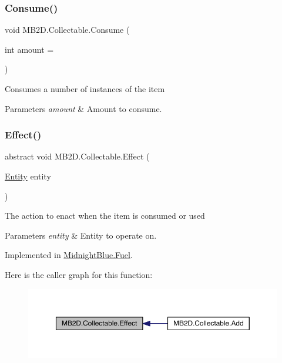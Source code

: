 \subsubsection{\texorpdfstring{Consume()}{Consume()}}
{\footnotesize\ttfamily void M\+B2\+D.\+Collectable.\+Consume (\begin{DoxyParamCaption}\item[{int}]{amount = {} }\end{DoxyParamCaption})\hspace{0.3cm}{\ttfamily [inline]}}



Consumes a number of instances of the item 


\begin{DoxyParams}{Parameters}
{\em amount} & Amount to consume.\\
\hline
\end{DoxyParams}
\hypertarget{class_m_b2_d_1_1_collectable_aeb2c8847eb3d5937b015f298703fd753}{}\label{class_m_b2_d_1_1_collectable_aeb2c8847eb3d5937b015f298703fd753} 
\subsubsection{\texorpdfstring{Effect()}{Effect()}}
{\footnotesize\ttfamily abstract void M\+B2\+D.\+Collectable.\+Effect (\begin{DoxyParamCaption}\item[{\hyperlink{class_m_b2_d_1_1_entity_component_1_1_entity}{Entity}}]{entity }\end{DoxyParamCaption})\hspace{0.3cm}{\ttfamily [pure virtual]}}



The action to enact when the item is consumed or used 


\begin{DoxyParams}{Parameters}
{\em entity} & Entity to operate on.\\
\hline
\end{DoxyParams}


Implemented in \hyperlink{class_midnight_blue_1_1_fuel_a9ab52c79211ec8cdcc9389f772615ac0}{Midnight\+Blue.\+Fuel}.

Here is the caller graph for this function\+:\nopagebreak
\begin{figure}[H]
\begin{center}
\leavevmode
\includegraphics[width=350pt]{class_m_b2_d_1_1_collectable_aeb2c8847eb3d5937b015f298703fd753_icgraph}
\end{center}
\end{figure}


